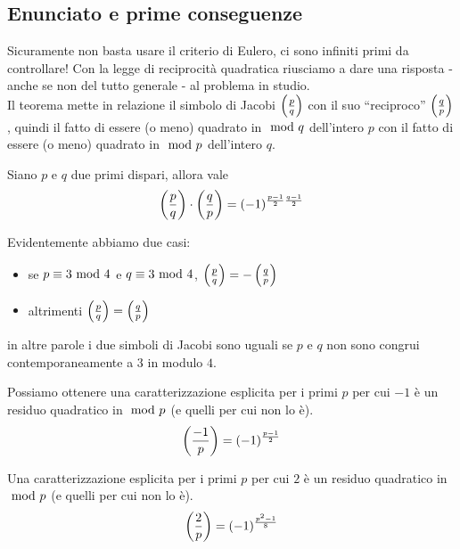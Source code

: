 \subsection{Enunciato e prime conseguenze}
Sicuramente non basta usare il criterio di Eulero, ci sono infiniti primi da controllare! Con la legge di reciprocità quadratica riusciamo a dare una risposta - anche se non del tutto generale - al problema in studio. \\ Il teorema mette in relazione il simbolo di Jacobi  $\left(\frac{p}{q}\right)$ con il suo \enquote{reciproco} $\left(\frac{q}{p}\right)$, quindi il fatto di essere (o meno) quadrato in $\ \mathrm{mod}\ q$ dell'intero $p$ con il fatto di essere (o meno) quadrato in $\ \mathrm{mod}\ p$ dell'intero $q$. 
\begin{teorema}
	Siano $p$ e $q$ due primi dispari, allora vale
	\begin{equation*}
	\left(\frac{p}{q}\right)\cdot\left(\frac{q}{p}\right)=(-1)^{\frac{p-1}{2}\frac{q-1}{2}}
	\end{equation*}
\end{teorema}
\begin{osservazione} 
	Evidentemente abbiamo due casi:
	\begin{itemize}
		\item se $p\equiv3\ \mathrm{mod}\ 4$ e $q\equiv3\ \mathrm{mod}\ 4$, $\left(\frac{p}{q}\right)=-\left(\frac{q}{p}\right)$
		\item altrimenti $\left(\frac{p}{q}\right)=\left(\frac{q}{p}\right)$
	\end{itemize}
	in altre parole i due simboli di Jacobi sono uguali se $p$ e $q$ non sono congrui contemporaneamente a $3$ in modulo $4$. 
\end{osservazione}
\begin{corollario}
	Possiamo ottenere una caratterizzazione esplicita per i primi $p$ per cui $-1$ è un residuo quadratico in $\ \mathrm{mod}\ p$ (e quelli per cui non lo è).
	\begin{equation*}
	\left(\frac{-1}{p}\right)=(-1)^{\frac{p-1}{2}}
	\end{equation*}
\end{corollario}
\begin{corollario}
	Una caratterizzazione esplicita per i primi $p$ per cui $2$ è un residuo quadratico in $\ \mathrm{mod}\ p$ (e quelli per cui non lo è).
	\begin{equation*}
	\left(\frac{2}{p}\right)=(-1)^{\frac{p^2-1}{8}}
	\end{equation*}
\end{corollario}
